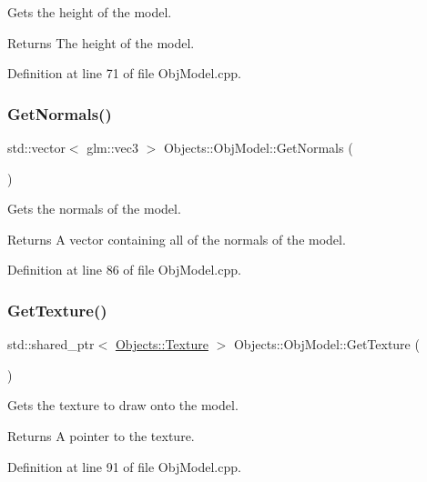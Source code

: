 Gets the height of the model. \begin{DoxyReturn}{Returns}
The height of the model. 
\end{DoxyReturn}


Definition at line 71 of file Obj\+Model.\+cpp.

\mbox{\label{class_objects_1_1_obj_model_a850d4f9b45247cc410b9d394973895ee}} 
\subsubsection{\texorpdfstring{Get\+Normals()}{GetNormals()}}
{\footnotesize\ttfamily std\+::vector$<$ glm\+::vec3 $>$ Objects\+::\+Obj\+Model\+::\+Get\+Normals (\begin{DoxyParamCaption}{ }\end{DoxyParamCaption})}

Gets the normals of the model. \begin{DoxyReturn}{Returns}
A vector containing all of the normals of the model. 
\end{DoxyReturn}


Definition at line 86 of file Obj\+Model.\+cpp.

\mbox{\label{class_objects_1_1_obj_model_a29c30b353f9089312caa7667fcdebc6c}} 
\subsubsection{\texorpdfstring{Get\+Texture()}{GetTexture()}}
{\footnotesize\ttfamily std\+::shared\+\_\+ptr$<$ \hyperlink{class_objects_1_1_texture}{Objects\+::\+Texture} $>$ Objects\+::\+Obj\+Model\+::\+Get\+Texture (\begin{DoxyParamCaption}{ }\end{DoxyParamCaption})}

Gets the texture to draw onto the model. \begin{DoxyReturn}{Returns}
A pointer to the texture. 
\end{DoxyReturn}


Definition at line 91 of file Obj\+Model.\+cpp.

